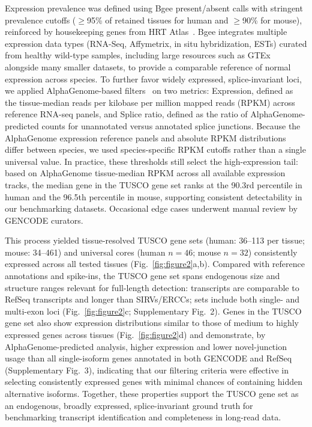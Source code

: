 \documentclass[pdflatex,sn-nature]{sn-jnl}%
\newcommand{\tuscoGeneSet}{TUSCO gene set}
\begin{document}
Expression prevalence was defined using Bgee present/absent calls with stringent prevalence cutoffs ($\geq$95\% of retained tissues for human and $\geq$90\% for mouse), reinforced by housekeeping genes from HRT Atlas~\cite{bastian_bgee_2021,hounkpe_hrt_2021}. Bgee integrates multiple expression data types (RNA-Seq, Affymetrix, in situ hybridization, ESTs) curated from healthy wild-type samples, including large resources such as GTEx~\cite{lonsdale_genotype-tissue_2013} alongside many smaller datasets, to provide a comparable reference of normal expression across species. To further favor widely expressed, splice-invariant loci, we applied AlphaGenome-based filters~\cite{avsec_advancing_2026} on two metrics: Expression, defined as the tissue-median reads per kilobase per million mapped reads (RPKM) across reference RNA-seq panels, and Splice ratio, defined as the ratio of AlphaGenome-predicted counts for unannotated versus annotated splice junctions. Because the AlphaGenome expression reference panels and absolute RPKM distributions differ between species, we used species-specific RPKM cutoffs rather than a single universal value. In practice, these thresholds still select the high-expression tail: based on AlphaGenome tissue-median RPKM across all available expression tracks, the median gene in the \tuscoGeneSet{} ranks at the 90.3rd percentile in human and the 96.5th percentile in mouse, supporting consistent detectability in our benchmarking datasets. Occasional edge cases underwent manual review by GENCODE curators.

This process yielded tissue-resolved \tuscoGeneSet{}s (human: 36--113 per tissue; mouse: 34--461) and universal cores (human $n = 46$; mouse $n = 32$) consistently expressed across all tested tissues (Fig.~\ref{fig:figure2}a,b). Compared with reference annotations and spike-ins, the \tuscoGeneSet{} spans endogenous size and structure ranges relevant for full-length detection: transcripts are comparable to RefSeq transcripts and longer than SIRVs/ERCCs; sets include both single- and multi-exon loci (Fig.~\ref{fig:figure2}c; Supplementary Fig.~2). Genes in the \tuscoGeneSet{} also show expression distributions similar to those of medium to highly expressed genes across tissues (Fig.~\ref{fig:figure2}d) and demonstrate, by AlphaGenome-predicted analysis, higher expression and lower novel-junction usage than all single-isoform genes annotated in both GENCODE and RefSeq (Supplementary Fig.~3), indicating that our filtering criteria were effective in selecting consistently expressed genes with minimal chances of containing hidden alternative isoforms. Together, these properties support the \tuscoGeneSet{} as an endogenous, broadly expressed, splice-invariant ground truth for benchmarking transcript identification and completeness in long-read data.
\end{document}
